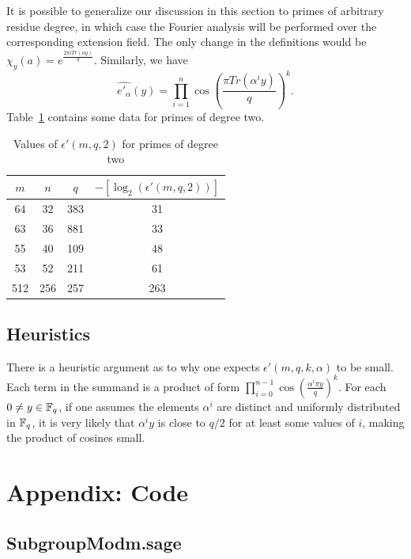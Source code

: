 \documentclass[envcountsame]{llncs}
\begin{document}
It is possible to generalize our discussion in this section to primes of arbitrary residue degree, in which case the Fourier analysis will be performed over the corresponding extension field. The only change in the definitions would be $\chi_y(a) = e^{ \frac{2 \pi i Tr(a y)}{q}}$. Similarly, we have
\[
    \widehat{e'_\alpha}(y) = \prod_{i=1}^{n} \cos \left(\frac{ \pi Tr(\alpha^i y) }{q} \right)^k.
\]
Table~\ref{tab: deg2} contains some data for primes of degree two.

\begin{table}[H]
\caption{Values of $\epsilon'(m,q,2)$ for primes of degree two}
\begin{center}
\begin{tabular}{c|c|c|c} \label{tab: deg2}
$m$ & $n$  & $q$ & $-[\log_2(\epsilon'(m,q,2))]$ \\
\hline
64 & 32&383 & 31 \\
63 & 36 & 881 & 33 \\
55 & 40 &109 & 48 \\
53 & 52  & 211 & 61 \\
512 & 256 &257 & 263
\end{tabular}
\end{center}
\end{table}

\subsection{Heuristics}

There is a heuristic argument as to why one expects $\epsilon'(m,q,k,\alpha)$ to be small. Each term in the summand is a product of form $\prod_{i=0}^{n-1} \cos \left(\frac{ \alpha^i \pi y}{q} \right)^k$. For each $0 \neq y \in \mathbb{F}_q$, if one assumes the elements $\alpha^i$ are distinct and uniformly distributed in $\mathbb{F}_q$, it is very likely that $\alpha^i y$ is close to $q/2$ for at least some values of $i$, making the product of cosines small.




\section{Appendix: Code}

\subsection{SubgroupModm.sage}
\end{document}
